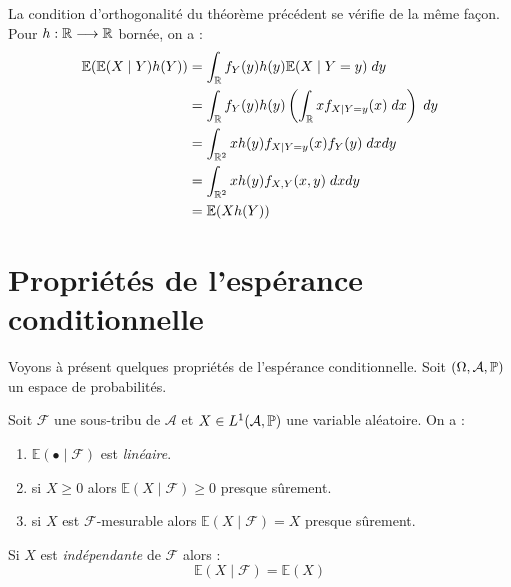 \begin{remark}
    La condition d'orthogonalité du théorème précédent se vérifie de la même façon. Pour $ h : \mathbb{R} \longrightarrow \mathbb{R}$ 
    bornée, on a : 
        \begin{align*}
            \mathbb{E}( \mathbb{E}( X \mid Y) h(Y)) &= \int_{\mathbb{R}}  f_Y(y) h(y) \mathbb{E}(X \mid Y = y) \; dy \\ 
            &= \int_{\mathbb{R}} f_Y(y) h(y) \left( \int_{\mathbb{R}} x f_{X \mid Y = y}(x) \; dx \right) \; dy \\ 
            &= \int_{\mathbb{R}^2} x h(y) f_{X \mid Y = y}(x) f_Y(y) \; dx dy \\ 
            &= \int_{\mathbb{R}^2} x h(y) f_{X, Y}(x, y) \; dx dy \\ 
            &= \mathbb{E}(Xh(Y)) 
        \end{align*}
\end{remark}


\section{Propriétés de l'espérance conditionnelle}

Voyons à présent quelques propriétés de l'espérance conditionnelle. 
Soit $( \Omega, \mathcal{A}, \mathbb{P})$ un espace de probabilités. 

\begin{prop}[Calcul]
    Soit $ \mathcal{F}$ une sous-tribu de $ \mathcal{A}$ et $X \in L^1( \mathcal{A}, \mathbb{P})$ une variable aléatoire. 
    On a : 
    \begin{enumerate}[label=\roman*)]
        \item $\mathbb{E}( \bullet \mid \mathcal{F} ) $ est \emph{linéaire}. 
        \item si $X \geqslant 0$ alors $ \mathbb{E}(X \mid \mathcal{F} ) \geqslant 0$ {presque sûrement}. 
        \item si $X$ est $ \mathcal{F}$-mesurable alors $ \mathbb{E}(X \mid \mathcal{F} ) = X $ {presque sûrement}. 
    \end{enumerate}  
\end{prop}

\begin{prop}[Indépendance]
    Si $X$ est \emph{indépendante} de $ \mathcal{F}$ alors : 
        $$ \mathbb{E}(X \mid \mathcal{F} ) = \mathbb{E}(X) $$   
\end{prop}

